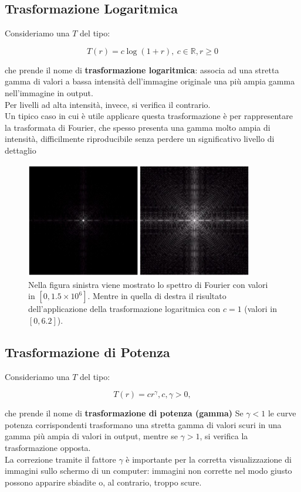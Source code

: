 \subsection{Trasformazione Logaritmica}

Consideriamo una $T$ del tipo:

$$
    T(r) = c \log(1 + r), \ c \in  \mathbb{R}, r \geq 0
$$

che prende il nome di \textbf{trasformazione logaritmica}: associa ad una
stretta gamma di valori a bassa intensità dell'immagine originale
una più ampia gamma nell'immagine in output.\\
Per livelli ad alta intensità, invece, si verifica il contrario.\\
Un tipico caso in cui è utile applicare questa trasformazione è per
rappresentare la trasformata di Fourier, che spesso presenta una
gamma molto ampia di intensità, difficilmente riproducibile senza
perdere un significativo livello di dettaglio

\begin{figure}[H]
    \centering
    \includegraphics[width=10cm, keepaspectratio]{capitoli/immagini/imgs/trasformazione_logaritmica_esempio_4.jpg}
    \caption{Nella figura sinistra viene mostrato lo spettro di Fourier con valori in $[0, 1.5 \times 10^6]$. Mentre in quella di destra il risultato dell'applicazione della trasformazione logaritmica
        con $c = 1$ (valori in $[0, 6.2]$).
    }
\end{figure}

\subsection{Trasformazione di Potenza}

Consideriamo una $T$ del tipo:

$$
    T(r) = cr^\gamma, c, \gamma > 0,
$$

che prende il nome di \textbf{trasformazione di potenza (gamma)}
Se $\gamma < 1$ le curve potenza corrispondenti trasformano una stretta
gamma di valori scuri in una gamma più ampia di valori in output,
mentre se $\gamma > 1$, si verifica la trasformazione opposta.\\
La correzione tramite il fattore $\gamma$ è importante per la corretta
visualizzazione di immagini sullo schermo di un computer:
immagini non corrette nel modo giusto possono apparire sbiadite o,
al contrario, troppo scure.

